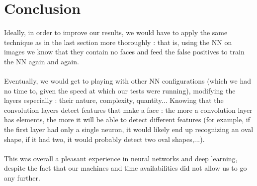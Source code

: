 \documentclass[french]{article}
\begin{document}
\newpage

\section{Conclusion}

\paragraph{} Ideally, in order to improve our results, we would have to apply the same technique as in the last section more thoroughly : that is, using the NN on images we know that they contain no faces and feed the false positives to train the NN again and again.

\paragraph{} Eventually, we would get to playing with other NN configurations (which we had no time to, given the speed at which our tests were running), modifying the layers especially : their nature, complexity, quantity... Knowing that the convolution layers detect features that make a face : the more a convolution layer has elements, the more it will be able to detect different features (for example, if the first layer had only a single neuron, it would likely end up recognizing an oval shape, if it had two, it would probably detect two oval shapes,...).

\paragraph{} This was overall a pleasant experience in neural networks and deep learning, despite the fact that our machines and time availabilities did not allow us to go any further.
\end{document}

